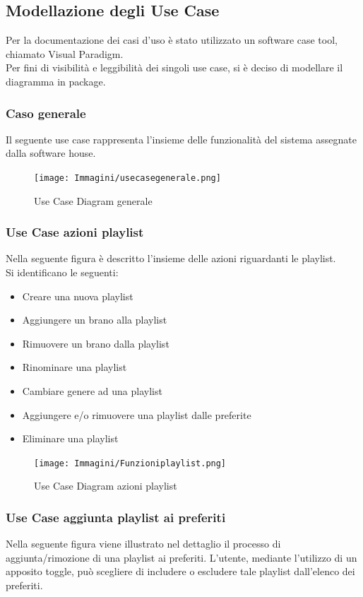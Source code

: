 \documentclass{article}
\begin{document}
		\subsection{Modellazione degli Use Case}
		Per la documentazione dei casi d'uso è stato utilizzato un software case tool, chiamato Visual Paradigm.\\
		Per fini di visibilità e leggibilità dei singoli use case, si è deciso di modellare il diagramma in package.
			\subsubsection{Caso generale}
			Il seguente use case rappresenta l'insieme delle funzionalità del sistema assegnate dalla software house.
				\begin{figure}[H]
					\centering
					\texttt{[image: Immagini/usecasegenerale.png]}
					\caption{Use Case Diagram generale}
				\end{figure}
				
			\subsubsection{Use Case azioni playlist}
			Nella seguente figura è descritto l'insieme delle azioni riguardanti le playlist.\\
			Si identificano le seguenti:
			\begin{itemize}
				\item Creare una nuova playlist
				\item Aggiungere un brano alla playlist
				\item Rimuovere un brano dalla playlist
				\item Rinominare una playlist
				\item Cambiare genere ad una playlist
				\item Aggiungere e/o rimuovere una playlist dalle preferite
				\item Eliminare una playlist
			\end{itemize}
			
			\begin{figure}[H]
				\centering
				\texttt{[image: Immagini/Funzioniplaylist.png]}
				\caption{Use Case Diagram azioni playlist}
			\end{figure}
			\subsubsection{Use Case aggiunta playlist ai preferiti}
			Nella seguente figura viene illustrato nel dettaglio il processo di aggiunta/rimozione di una playlist ai preferiti. L'utente, mediante l'utilizzo di un apposito toggle, può scegliere di includere o escludere tale playlist dall'elenco dei preferiti.
			
\end{document}
